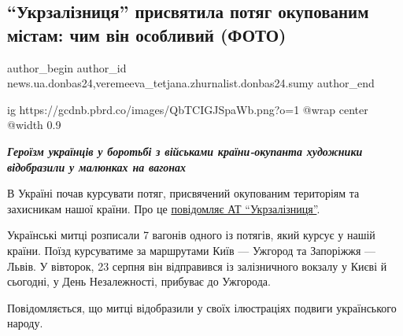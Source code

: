  
 
 
 
 
 
\subsection{\enquote{Укрзалізниця} присвятила потяг окупованим містам: чим він особливий (ФОТО)}
\label{sec:24_08_2022.stz.news.ua.donbas24.1.ukrzaliznycja_potjag_okupovani_mista}
 
\ifcmt
 author_begin
   author_id news.ua.donbas24,veremeeva_tetjana.zhurnalist.donbas24.sumy
 author_end
\fi

\ifcmt
  ig https://gcdnb.pbrd.co/images/QbTCIGJSpaWb.png?o=1
  @wrap center
  @width 0.9
\fi

\begin{center}
  \em\color{blue}\bfseries\Large
	Героїзм українців у боротьбі з військами країни-окупанта художники
відобразили у малюнках на вагонах
\end{center}

В Україні почав курсувати потяг, присвячений окупованим територіям та
захисникам нашої країни. Про це \href{https://t.me/UkrzalInfo/3161}{повідомляє АТ \enquote{Укрзалізниця}}.

Українські митці розписали 7 вагонів одного із потягів, який курсує у нашій
країни. Поїзд курсуватиме за маршрутами Київ — Ужгород та Запоріжжя — Львів. У
вівторок, 23 серпня він відправився із залізничного вокзалу у Києві й сьогодні,
у День Незалежності, прибуває до Ужгорода.

Повідомляється, що митці відобразили у своїх ілюстраціях подвиги українського
народу. 



